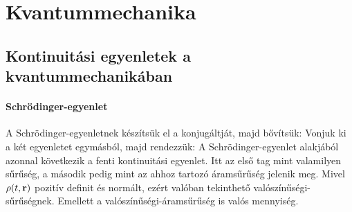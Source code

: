  \section{Kvantummechanika}
  
  \subsection{Kontinuitási egyenletek a kvantummechanikában}\label{ss:A08-kv}
   
   \paragraph{Schrödinger-egyenlet}
    
    A Schrödinger-egyenletnek készítsük el a konjugáltját, majd bővítsük:
    Vonjuk ki a két egyenletet egymásból, majd rendezzük:
    A Schrödinger-egyenlet alakjából azonnal következik a fenti kontinuitási egyenlet. Itt az első tag mint valamilyen sűrűség, a második pedig mint az ahhoz tartozó áramsűrűség jelenik meg. Mivel $\rho(t,\mathbf{r})$ pozitív definit és normált, ezért valóban tekinthető valószínűségi-sűrűségnek. Emellett a valószínűségi-áramsűrűség is valós mennyiség.
    
